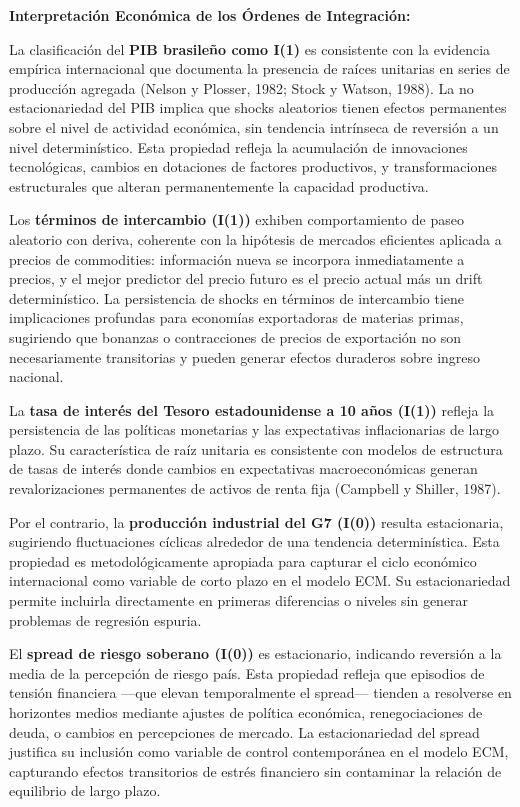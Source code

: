 \documentclass[3p,11pt]{elsarticle}
\begin{document}
\textbf{Interpretación Económica de los Órdenes de Integración:}

La clasificación del \textbf{PIB brasileño como I(1)} es consistente con la evidencia empírica internacional que documenta la presencia de raíces unitarias en series de producción agregada (Nelson y Plosser, 1982; Stock y Watson, 1988). La no estacionariedad del PIB implica que shocks aleatorios tienen efectos permanentes sobre el nivel de actividad económica, sin tendencia intrínseca de reversión a un nivel determinístico. Esta propiedad refleja la acumulación de innovaciones tecnológicas, cambios en dotaciones de factores productivos, y transformaciones estructurales que alteran permanentemente la capacidad productiva.

Los \textbf{términos de intercambio (I(1))} exhiben comportamiento de paseo aleatorio con deriva, coherente con la hipótesis de mercados eficientes aplicada a precios de commodities: información nueva se incorpora inmediatamente a precios, y el mejor predictor del precio futuro es el precio actual más un drift determinístico. La persistencia de shocks en términos de intercambio tiene implicaciones profundas para economías exportadoras de materias primas, sugiriendo que bonanzas o contracciones de precios de exportación no son necesariamente transitorias y pueden generar efectos duraderos sobre ingreso nacional.

La \textbf{tasa de interés del Tesoro estadounidense a 10 años (I(1))} refleja la persistencia de las políticas monetarias y las expectativas inflacionarias de largo plazo. Su característica de raíz unitaria es consistente con modelos de estructura de tasas de interés donde cambios en expectativas macroeconómicas generan revalorizaciones permanentes de activos de renta fija (Campbell y Shiller, 1987).

Por el contrario, la \textbf{producción industrial del G7 (I(0))} resulta estacionaria, sugiriendo fluctuaciones cíclicas alrededor de una tendencia determinística. Esta propiedad es metodológicamente apropiada para capturar el ciclo económico internacional como variable de corto plazo en el modelo ECM. Su estacionariedad permite incluirla directamente en primeras diferencias o niveles sin generar problemas de regresión espuria.

El \textbf{spread de riesgo soberano (I(0))} es estacionario, indicando reversión a la media de la percepción de riesgo país. Esta propiedad refleja que episodios de tensión financiera ---que elevan temporalmente el spread--- tienden a resolverse en horizontes medios mediante ajustes de política económica, renegociaciones de deuda, o cambios en percepciones de mercado. La estacionariedad del spread justifica su inclusión como variable de control contemporánea en el modelo ECM, capturando efectos transitorios de estrés financiero sin contaminar la relación de equilibrio de largo plazo.
\end{document}
